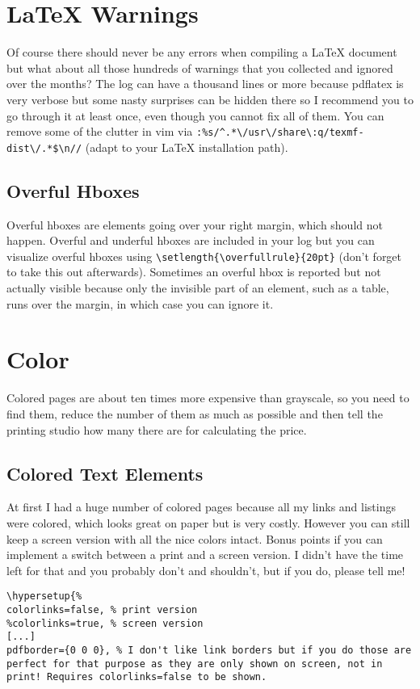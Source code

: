 \section{LaTeX Warnings}
Of course there should never be any errors when compiling a LaTeX document but what about all those hundreds of warnings that you collected and ignored over the months?
The log can have a thousand lines or more because pdflatex is very verbose but some nasty surprises can be hidden there so I recommend you to go through it at least once, even though you cannot fix all of them.
You can remove some of the clutter in vim via \verb+:%s/^.*\/usr\/share\:q/texmf-dist\/.*$\n//+ (adapt to your LaTeX installation path).

\subsection{Overful Hboxes}
Overful hboxes are elements going over your right margin, which should not happen.
Overful and underful hboxes are included in your log but you can visualize overful hboxes using \verb+\setlength{\overfullrule}{20pt}+ (don't forget to take this out afterwards).
Sometimes an overful hbox is reported but not actually visible because only the invisible part of an element, such as a table, runs over the margin, in which case you can ignore it.

\section{Color}
Colored pages are about ten times more expensive than grayscale, so you need to find them, reduce the number of them as much as possible and then tell the printing studio how many there are for calculating the price.

\subsection{Colored Text Elements }
At first I had a huge number of colored pages because all my links and listings were colored, which looks great on paper but is very costly.
However you can still keep a screen version with all the nice colors intact.
Bonus points if you can implement a switch between a print and a screen version.
I didn't have the time left for that and you probably don't and shouldn't, but if you do, please tell me!

\begin{lstlisting}
\hypersetup{%
colorlinks=false, % print version
%colorlinks=true, % screen version
[...]
pdfborder={0 0 0}, % I don't like link borders but if you do those are perfect for that purpose as they are only shown on screen, not in print! Requires colorlinks=false to be shown.
\end{lstlisting}

